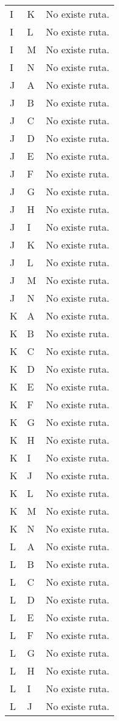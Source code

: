 \documentclass{article}
\begin{document}
\begin{longtable}{llp{}}
I & K & No existe ruta.\\
I & L & No existe ruta.\\
I & M & No existe ruta.\\
I & N & No existe ruta.\\
J & A & No existe ruta.\\
J & B & No existe ruta.\\
J & C & No existe ruta.\\
J & D & No existe ruta.\\
J & E & No existe ruta.\\
J & F & No existe ruta.\\
J & G & No existe ruta.\\
J & H & No existe ruta.\\
J & I & No existe ruta.\\
J & K & No existe ruta.\\
J & L & No existe ruta.\\
J & M & No existe ruta.\\
J & N & No existe ruta.\\
K & A & No existe ruta.\\
K & B & No existe ruta.\\
K & C & No existe ruta.\\
K & D & No existe ruta.\\
K & E & No existe ruta.\\
K & F & No existe ruta.\\
K & G & No existe ruta.\\
K & H & No existe ruta.\\
K & I & No existe ruta.\\
K & J & No existe ruta.\\
K & L & No existe ruta.\\
K & M & No existe ruta.\\
K & N & No existe ruta.\\
L & A & No existe ruta.\\
L & B & No existe ruta.\\
L & C & No existe ruta.\\
L & D & No existe ruta.\\
L & E & No existe ruta.\\
L & F & No existe ruta.\\
L & G & No existe ruta.\\
L & H & No existe ruta.\\
L & I & No existe ruta.\\
L & J & No existe ruta.\\

\end{longtable}
\end{document}
